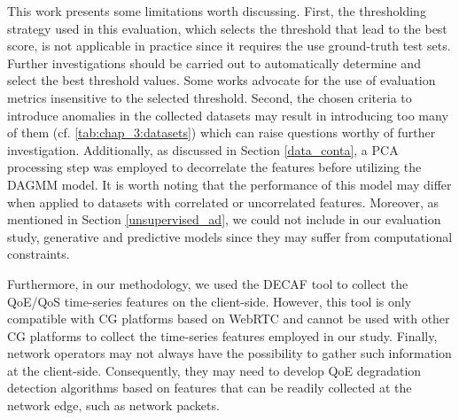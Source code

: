 This work presents some limitations worth discussing. First, the thresholding strategy used in this evaluation, which selects the threshold that lead to the best score, is not applicable in practice since it requires the use ground-truth test sets. Further investigations should be carried out to automatically determine and select the best threshold values. Some works \cite{Cao2020TheMC, Fourure2021AnomalyDH} advocate for the use of evaluation metrics insensitive to the selected threshold. Second, the chosen criteria to introduce anomalies in the collected datasets may result in introducing too many of them (cf. \ref{tab:chap_3:datasets}) which can raise questions worthy of further investigation. Additionally, as discussed in Section \ref{data_conta}, a PCA processing step was employed to decorrelate the features before utilizing the DAGMM model. It is worth noting that the performance of this model may differ when applied to datasets with correlated or uncorrelated features. Moreover, as mentioned in Section \ref{unsupervised_ad}, we could not include in our evaluation study, generative and predictive models since they may suffer from computational constraints.

Furthermore, in our methodology, we used the DECAF tool \cite{Iqbal2021DissectingCG} to collect the QoE/QoS time-series features on the client-side. However, this tool is only compatible with CG platforms based on WebRTC and cannot be used with other CG platforms to collect the time-series features employed in our study. Finally, network operators may not always have the possibility to gather such information at the client-side. Consequently, they may need to develop QoE degradation detection algorithms based on features that can be readily collected at the network edge, such as network packets.





